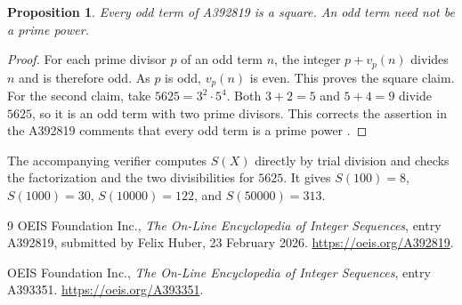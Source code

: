 \documentclass[10pt,letterpaper]{article}
\newtheorem{proposition}{Proposition}
\begin{document}
\begin{proposition}
Every odd term of A392819 is a square. An odd term need not be a
prime power.
\end{proposition}

\begin{proof}
For each prime divisor \(p\) of an odd term \(n\), the integer
\(p+v_p(n)\) divides \(n\) and is therefore odd. As \(p\) is odd,
\(v_p(n)\) is even. This proves the square claim. For the second claim,
take \(5625=3^2\cdot5^4\). Both \(3+2=5\) and \(5+4=9\) divide
\(5625\), so it is an odd term with two prime divisors. This corrects
the assertion in the A392819 comments that every odd term is a prime
power \cite{a392819}.
\end{proof}

The accompanying verifier computes \(S(X)\) directly by trial division
and checks the factorization and the two divisibilities for \(5625\).
It gives \(S(100)=8\), \(S(1000)=30\), \(S(10000)=122\), and
\(S(50000)=313\).

\begin{thebibliography}{9}
OEIS Foundation Inc., \emph{The On-Line Encyclopedia of Integer Sequences},
entry A392819, submitted by Felix Huber, 23 February 2026.
\url{https://oeis.org/A392819}.

OEIS Foundation Inc., \emph{The On-Line Encyclopedia of Integer Sequences},
entry A393351. \url{https://oeis.org/A393351}.
\end{thebibliography}
\end{document}
